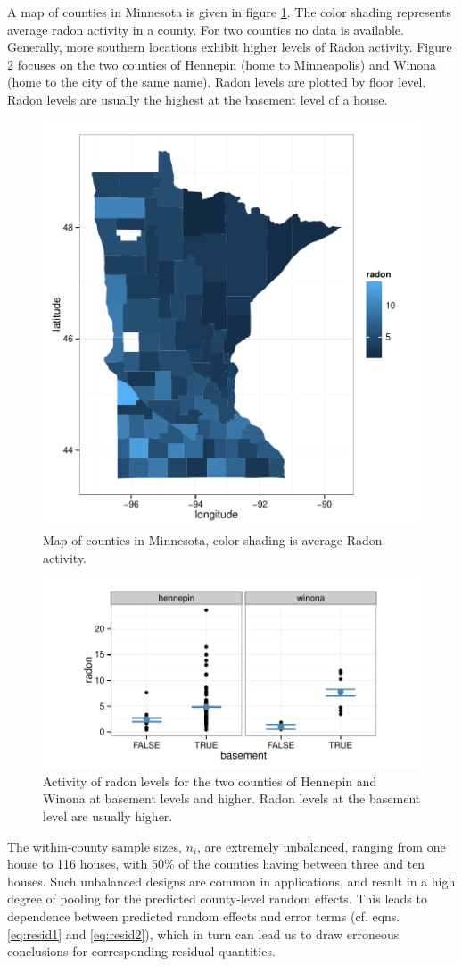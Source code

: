 \documentclass{article} %
\newcommand{\cov}{\ensuremath{\mathrm{Cov}}}
\begin{document}
A map of counties in Minnesota is given in figure \ref{fig:map}. The color shading represents average radon activity in a county. For two counties no data is available. Generally, more southern locations exhibit higher  levels of Radon activity. Figure \ref{fig:tc} focuses on the two counties of Hennepin (home to Minneapolis) and Winona (home to the city of the same name). Radon levels are plotted by floor level. Radon levels are usually the highest at the basement level of a house. 
%
\begin{figure}[htb]
\centering
\includegraphics[width=0.5\linewidth]{figures/map.pdf}
\caption{\label{fig:map} Map of counties in Minnesota, color shading is average Radon activity.}
\end{figure}
%
\begin{figure}[htb]
\centering
\includegraphics[width=0.8\linewidth]{figures/radon-twocounties.pdf}
\caption{\label{fig:tc} Activity of radon levels for the two counties of Hennepin and Winona at basement levels and higher. Radon levels at the basement level are usually higher.}
\end{figure}
%
The within-county sample sizes, $n_i$, are extremely unbalanced, ranging from one house to 116 houses, with 50\% of the counties having between three and ten houses. Such unbalanced designs are common in applications, and result in a high degree of pooling for the predicted county-level random effects. %
This leads to dependence between  predicted random effects and  error terms (cf. eqns. \ref{eq:resid1} and \ref{eq:resid2}), which in turn can lead us to draw erroneous conclusions for corresponding residual quantities.
\end{document}
